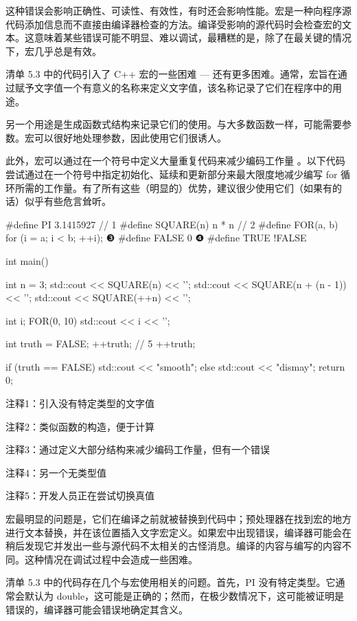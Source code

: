 这种错误会影响正确性、可读性、有效性，有时还会影响性能。宏是一种向程序源代码添加信息而不直接由编译器检查的方法。编译受影响的源代码时会检查宏的文本。这意味着某些错误可能不明显、难以调试，最糟糕的是，除了在最关键的情况下，宏几乎总是有效。


清单 5.3 中的代码引入了 C++ 宏的一些困难 — 还有更多困难。通常，宏旨在通过赋予文字值一个有意义的名称来定义文字值，该名称记录了它们在程序中的用途。

另一个用途是生成函数式结构来记录它们的使用。与大多数函数一样，可能需要参数。宏可以很好地处理参数，因此使用它们很诱人。

此外，宏可以通过在一个符号中定义大量重复代码来减少编码工作量 。以下代码尝试通过在一个符号中指定初始化、延续和更新部分来最大限度地减少编写 for 循环所需的工作量。有了所有这些（明显的）优势，建议很少使用它们（如果有的话）似乎有些危言耸听。


\begin{cpp}
#define PI 3.1415927 // 1
#define SQUARE(n) n * n // 2
#define FOR(a, b) for (i = a; i < b; ++i); ❸
#define FALSE 0 ❹
#define TRUE !FALSE

int main() {
  int n = 3;
  std::cout << SQUARE(n) << '\n';
  std::cout << SQUARE(n + (n - 1)) << '\n';
  std::cout << SQUARE(++n) << '\n';

  int i;
  FOR(0, 10)
    std::cout << i << '\n';

  int truth = FALSE;
  ++truth; // 5
  ++truth;

  if (truth == FALSE)
    std::cout << "smooth\n";
  else
    std::cout << "dismay\n";
  return 0;
}
\end{cpp}

{\footnotesize
注释1：引入没有特定类型的文字值

注释2：类似函数的构造，便于计算

注释3：通过定义大部分结构来减少编码工作量，但有一个错误

注释4：另一个无类型值

注释5：开发人员正在尝试切换真值
}


宏最明显的问题是，它们在编译之前就被替换到代码中；预处理器在找到宏的地方进行文本替换，并在该位置插入文字宏定义。如果宏中出现错误，编译器可能会在稍后发现它并发出一些与源代码不太相关的古怪消息。编译的内容与编写的内容不同。这种情况在调试过程中会造成一些困难。

清单 5.3 中的代码存在几个与宏使用相关的问题。首先，PI 没有特定类型。它通常会默认为 double，这可能是正确的；然而，在极少数情况下，这可能被证明是错误的，编译器可能会错误地确定其含义。


